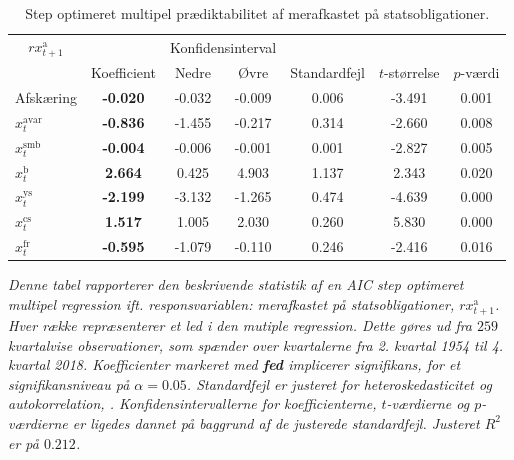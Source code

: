 \documentclass[
  a4paper,
  oneside]{memoir}
\begin{document}
\begin{table}[H]

\caption{\label{tab:MULT-step-s}Step optimeret multipel prædiktabilitet af merafkastet på statsobligationer.}
\centering
\begin{threeparttable}
\begin{tabular}[t]{lcccccc}
\toprule
\multicolumn{1}{c}{$rx_{t+1}^{\text{a}}$} & \multicolumn{1}{c}{ } & \multicolumn{2}{c}{Konfidensinterval} & \multicolumn{3}{c}{ } \\
\cmidrule(l{3pt}r{3pt}){1-1} \cmidrule(l{3pt}r{3pt}){3-4}
  & Koefficient & Nedre & Øvre & Standardfejl & $t$-størrelse & $p$-værdi\\
\midrule
\rowcolor{gray!6}  Afskæring & \textbf{-0.020} & -0.032 & -0.009 & 0.006 & -3.491 & 0.001\\
$x_t^{\text{avar}}$ & \textbf{-0.836} & -1.455 & -0.217 & 0.314 & -2.660 & 0.008\\
\rowcolor{gray!6}  $x_t^{\text{smb}}$ & \textbf{-0.004} & -0.006 & -0.001 & 0.001 & -2.827 & 0.005\\
$x_t^{\text{b}}$ & \textbf{ 2.664} & 0.425 & 4.903 & 1.137 & 2.343 & 0.020\\
\rowcolor{gray!6}  $x_t^{\text{ys}}$ & \textbf{-2.199} & -3.132 & -1.265 & 0.474 & -4.639 & 0.000\\
$x_t^{\text{cs}}$ & \textbf{ 1.517} & 1.005 & 2.030 & 0.260 & 5.830 & 0.000\\
\rowcolor{gray!6}  $x_t^{\text{fr}}$ & \textbf{-0.595} & -1.079 & -0.110 & 0.246 & -2.416 & 0.016\\
\bottomrule
\end{tabular}
\begin{tablenotes}
\item \textit{Denne tabel rapporterer den beskrivende statistik af en AIC step optimeret multipel regression ift. responsvariablen: merafkastet på statsobligationer, $rx_{t+1}^{\text{a}}$. Hver række repræsenterer et led i den mutiple regression. Dette gøres ud fra $259$ kvartalvise observationer, som spænder over kvartalerne fra 2. kvartal 1954 til 4. kvartal 2018. Koefficienter markeret med \textbf{fed} implicerer signifikans, for et signifikansniveau på $\alpha=0.05$. Standardfejl er justeret for heteroskedasticitet og autokorrelation, \citep{Newey1987}. Konfidensintervallerne for koefficienterne, $t$-værdierne og $p$-værdierne er ligedes dannet på baggrund af de justerede standardfejl. Justeret $R^2$ er på $0.212$.}
\end{tablenotes}
\end{threeparttable}
\end{table}
\end{document}

